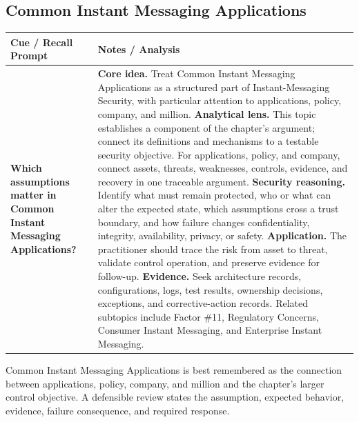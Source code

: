 \documentclass[11pt]{article}
\newcommand{\CornellHeader}{%
\rowcolor{Navy}\color{white}\bfseries Cue / Recall Prompt & \color{white}\bfseries Notes / Analysis\\\hline}
\newcommand{\CornellRow}[2]{%
\cellcolor{CueGray}\RaggedRight\textbf{#1} & \RaggedRight #2\\\hline}
\begin{document}
\subsection*{Common Instant Messaging Applications}
\begin{longtable}{>{\RaggedRight\arraybackslash}p{}|>{\RaggedRight\arraybackslash}p{}}
\CornellHeader
\CornellRow{Which assumptions matter in Common Instant Messaging Applications?}{\textbf{Core idea.} Treat Common Instant Messaging Applications as a structured part of Instant-Messaging Security, with particular attention to applications, policy, company, and million. \textbf{Analytical lens.} This topic establishes a component of the chapter's argument; connect its definitions and mechanisms to a testable security objective. For applications, policy, and company, connect assets, threats, weaknesses, controls, evidence, and recovery in one traceable argument. \textbf{Security reasoning.} Identify what must remain protected, who or what can alter the expected state, which assumptions cross a trust boundary, and how failure changes confidentiality, integrity, availability, privacy, or safety. \textbf{Application.} The practitioner should trace the risk from asset to threat, validate control operation, and preserve evidence for follow-up. \textbf{Evidence.} Seek architecture records, configurations, logs, test results, ownership decisions, exceptions, and corrective-action records. Related subtopics include Factor \#11, Regulatory Concerns, Consumer Instant Messaging, and Enterprise Instant Messaging.}
\end{longtable}
\begin{topicsummary}
Common Instant Messaging Applications is best remembered as the connection between applications, policy, company, and million and the chapter's larger control objective. A defensible review states the assumption, expected behavior, evidence, failure consequence, and required response.
\end{topicsummary}
\end{document}
